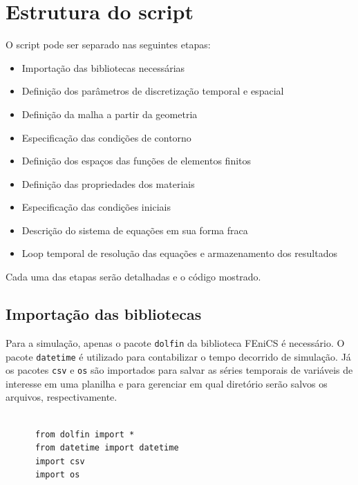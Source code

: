    \section{Estrutura do script}\label{mat:script}
    O script pode ser separado nas seguintes etapas:

    \begin{itemize}
    \item Importação das bibliotecas necessárias
    \item Definição dos parâmetros de discretização temporal e espacial
    \item Definição da malha a partir da geometria
    \item Especificação das condições de contorno
    \item Definição dos espaços das funções de elementos finitos
    \item Definição das propriedades dos materiais
    \item Especificação das condições iniciais
    \item Descrição do sistema de equações em sua forma fraca
    \item Loop temporal de resolução das equações e armazenamento dos resultados 
    \end{itemize}

    Cada uma das etapas serão detalhadas e o código mostrado.

    
    \subsection{Importação das bibliotecas}
    Para a simulação, apenas o pacote \texttt{dolfin} da biblioteca
    FEniCS é necessário. O pacote \texttt{datetime} é utilizado para
    contabilizar o tempo decorrido de simulação. Já os pacotes
    \texttt{csv} e \texttt{os} são importados para
    salvar as séries temporais de variáveis de interesse em uma planilha e para 
    gerenciar em qual diretório serão salvos os arquivos, respectivamente.

    \begin{verbatim}

      from dolfin import *
      from datetime import datetime
      import csv
      import os
    \end{verbatim}
   
